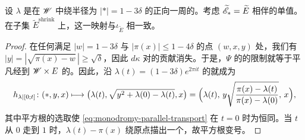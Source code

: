 \begin{lemma}\label{thm:monodromy-involution-agreement}
设 $\lambda$ 是在 $\mathscr{W}$ 中绕半径为 $|*|=1-3\delta$ 的\trCircle{}正向一周的\trLoop。考虑 $\widetilde{\mathscr{E}}_*=\widetilde{E}$ 相伴的单值\trAutomorphism。在子集 $\widetilde{E}^{\mathrm{shrink}}$ 上，这一映射与\trInvolution{}$\iota_{\widetilde{E}}$ 相一致。
\end{lemma}
\begin{proof}
在任何满足 $|w|=1-3\delta$ 与 $|\pi(x)|\le 1-4\delta$ 的点 $(w,x,y)$ 处，我们有 $|y|=|\sqrt{\pi(x)-w}\,|\ge\sqrt{\delta}$，因此 $d\kappa$ 对\trSymplecticForm{}的贡献消失。于是，$\Psi$ 的\trSymplectic\trConnection{}的限制就等于平凡\trConnection{}经\trProjection{}到 $\mathscr{W}\times E$ 的\trPullback。因此，沿 $\lambda(t)=(1-3\delta)e^{2\pi it}$ 的\trParallelTransport{}就成为
\begin{equation}\label{eq:monodromy-parallel-transport}
h_{\lambda|[0;t]}\colon(*,y,x)\longmapsto\bigl(\lambda(t),\sqrt{y^2+\lambda(0)-\lambda(t)},x\bigr)=\Bigl(\lambda(t),\,y\sqrt{\frac{\pi(x)-\lambda(t)}{\pi(x)-\lambda(0)}},\,x\Bigr),
\end{equation}
其中平方根的选取使 \eqref{eq:monodromy-parallel-transport} 在 $t=0$ 时为恒同。当 $t$ 从 $0$ 走到 $1$ 时，$\lambda(t)-\pi(x)$ 绕原点描出一个\trLoop，故平方根变号。
\end{proof}
